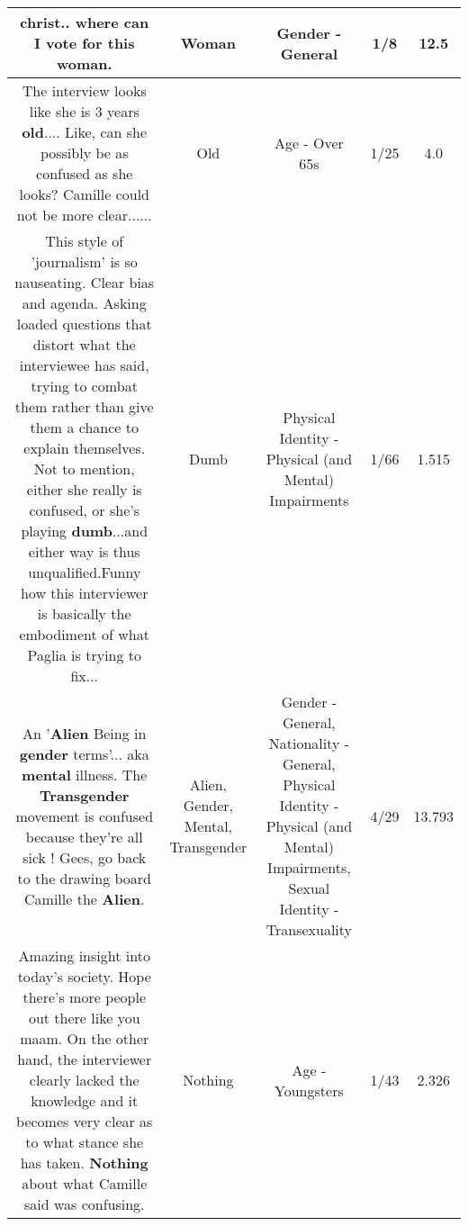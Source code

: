 \documentclass[11pt]{article}
\newlength\mylength
\begin{document}
\begin{center}
\begin{longtable}{|C{.65\mylength}|C{.30\mylength}|C{.12\mylength}|C{.12\mylength}|C{.12\mylength}|}
  \small christ.. where can I vote for this \textbf{woman}.\normalsize   & Woman & Gender - General & 1/8 & 12.5 \\  \hline
  \small The interview looks like she is 3 years \textbf{old}....   Like, can she possibly be as confused as she looks?  Camille could not be more clear......\normalsize   & Old & Age - Over 65s & 1/25 & 4.0 \\  \hline
  \small This style of 'journalism' is so nauseating. Clear bias and agenda. Asking loaded questions that distort what the interviewee has said, trying to combat them rather than give them a chance to explain themselves. Not to mention, either she really is confused, or she's playing \textbf{dumb}...and either way is thus unqualified.Funny how this interviewer is basically the embodiment of what Paglia is trying to fix...\normalsize   & Dumb & Physical Identity - Physical (and Mental) Impairments & 1/66 & 1.515 \\  \hline
  \small An '\textbf{Alien} Being in \textbf{gender} terms'... aka \textbf{mental} illness.  The \textbf{Transgender} movement is confused because they're all sick !  Gees, go back to the drawing board Camille the \textbf{Alien}.\normalsize   & Alien, Gender, Mental, Transgender & Gender - General, Nationality - General, Physical Identity - Physical (and Mental) Impairments, Sexual Identity - Transexuality & 4/29 & 13.793 \\  \hline
  \small Amazing insight into today's society. Hope there's more people out there like you maam. On the other hand, the interviewer clearly lacked the knowledge and it becomes very clear as to what stance she has taken. \textbf{Nothing} about what Camille said was confusing.\normalsize   & Nothing & Age - Youngsters & 1/43 & 2.326 \\  \hline

\end{longtable}
\end{center}
\end{document}
